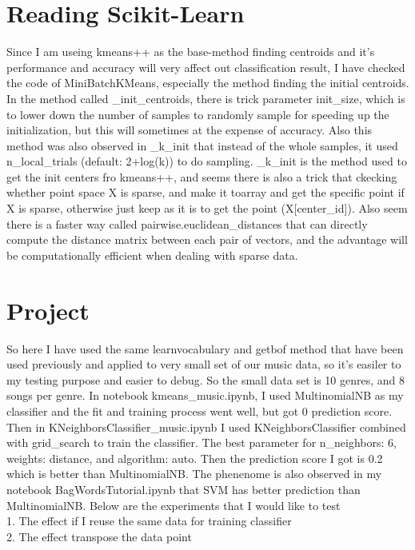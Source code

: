 \documentclass[final]{siamltexmm}
\begin{document}
\section{Reading Scikit-Learn}
Since I am useing kmeans++ as the base-method finding centroids and it's performance and accuracy will very affect out classification result, I have checked the code of MiniBatchKMeans, especially the method finding the initial centroids. In the method called \_init\_centroids, there is trick parameter init\_size, which is to lower down the number of samples to randomly sample for speeding up the initialization, but this will sometimes at the expense of accuracy. Also this method was also observed in \_k\_init that instead of the whole samples, it used n\_local\_trials (default: 2+log(k)) to do sampling. \_k\_init is the method used to get the init centers fro kmeans++, and seems there is also a trick that ckecking whether point space X is sparse, and make it toarray and get the specific point if X is sparse, otherwise just keep as it is to get the point (X[center\_id]). Also seem there is a faster way called pairwise.euclidean\_distances that can directly compute the distance matrix between each pair of vectors, and the advantage will be computationally efficient when dealing with sparse data.

\section{Project}
So here I have used the same learnvocabulary and getbof method that have been used previously and applied to very small set of our music data, so it's easiler to my testing purpose and easier to debug. So the small data set is 10 genres, and 8 songs per genre. In notebook kmeans\_music.ipynb, I used MultinomialNB as my classifier and the fit and training process went well, but got 0 prediction score. Then in KNeighborsClassifier\_music.ipynb I used KNeighborsClassifier combined with grid\_search to train the classifier. The best parameter for n\_neighbors: 6, weights: distance, and algorithm: auto. Then the prediction score I got is 0.2 which is better than MultinomialNB. The phenenome is also observed in my notebook BagWordsTutorial.ipynb that SVM has better prediction than MultinomialNB. Below are the experiments that I would like to test
\\ 1. The effect if I reuse the same data for training classifier
\\ 2. The effect transpose the data point
\end{document}
